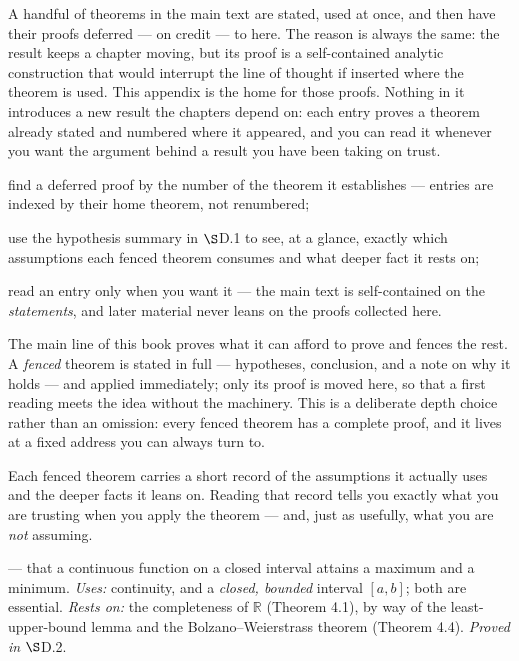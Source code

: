 \documentclass[a4paper,12pt,oneside]{memoir}
\begin{document}
\begin{lead}
A handful of theorems in the main text are stated, used at once, and then have their proofs deferred — on credit — to here. The reason is always the same: the result keeps a chapter moving, but its proof is a self-contained analytic construction that would interrupt the line of thought if inserted where the theorem is used. This appendix is the home for those proofs. Nothing in it introduces a new result the chapters depend on: each entry proves a theorem already stated and numbered where it appeared, and you can read it whenever you want the argument behind a result you have been taking on trust.
\end{lead}
\begin{objectives}
  \item find a deferred proof by the number of the theorem it establishes — entries are indexed by their home theorem, not renumbered;
  \item use the hypothesis summary in \(\S\)D.1 to see, at a glance, exactly which assumptions each fenced theorem consumes and what deeper fact it rests on;
  \item read an entry only when you want it — the main text is self-contained on the \emph{statements}, and later material never leans on the proofs collected here.
\end{objectives}
The main line of this book proves what it can afford to prove and fences the rest. A \emph{fenced} theorem is stated in full — hypotheses, conclusion, and a note on why it holds — and applied immediately; only its proof is moved here, so that a first reading meets the idea without the machinery. This is a deliberate depth choice rather than an omission: every fenced theorem has a complete proof, and it lives at a fixed address you can always turn to.

Each fenced theorem carries a short record of the assumptions it actually uses and the deeper facts it leans on. Reading that record tells you exactly what you are trusting when you apply the theorem — and, just as usefully, what you are \emph{not} assuming.

 — that a continuous function on a closed interval attains a maximum and a minimum. \emph{Uses:} continuity, and a \emph{closed, bounded} interval \([a, b]\); both are essential. \emph{Rests on:} the completeness of \(\mathbb{R}\) (Theorem 4.1), by way of the least-upper-bound lemma and the Bolzano–Weierstrass theorem (Theorem 4.4). \emph{Proved in} \(\S\)D.2.
\end{document}
